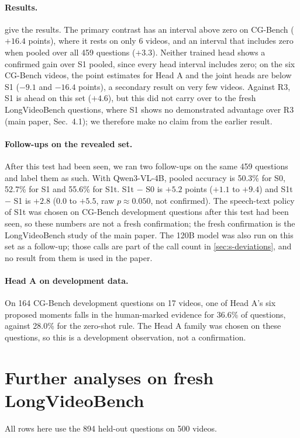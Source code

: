 \paragraph{Results.}
 give the results.
The primary contrast has an interval above zero on CG-Bench ($+16.4$ points), where it rests on only 6 videos, and an interval that includes zero when pooled over all 459 questions ($+3.3$).
Neither trained head shows a confirmed gain over S1 pooled, since every head interval includes zero; on the six CG-Bench videos, the point estimates for Head A and the joint heads are below S1 ($-9.1$ and $-16.4$ points), a secondary result on very few videos.
Against R3, S1 is ahead on this set ($+4.6$), but this did not carry over to the fresh LongVideoBench questions, where S1 shows no demonstrated advantage over R3 (main paper, Sec.~4.1); we therefore make no claim from the earlier result.

\paragraph{Follow-ups on the revealed set.}
After this test had been seen, we ran two follow-ups on the same 459 questions and label them as such.
With Qwen3-VL-4B, pooled accuracy is 50.3\% for S0, 52.7\% for S1 and 55.6\% for S1t.
S1t $-$ S0 is $+5.2$ points ($+1.1$ to $+9.4$) and S1t $-$ S1 is $+2.8$ ($0.0$ to $+5.5$, raw $p \approx 0.050$, not confirmed).
The speech-text policy of S1t was chosen on CG-Bench development questions after this test had been seen, so these numbers are not a fresh confirmation; the fresh confirmation is the LongVideoBench study of the main paper.
The 120B model was also run on this set as a follow-up; those calls are part of the call count in \cref{sec:s-deviations}, and no result from them is used in the paper.

\paragraph{Head A on development data.}
On 164 CG-Bench development questions on 17 videos, one of Head A's six proposed moments falls in the human-marked evidence for 36.6\% of questions, against 28.0\% for the zero-shot rule.
The Head A family was chosen on these questions, so this is a development observation, not a confirmation.

\section{Further analyses on fresh LongVideoBench}
\label{sec:s-lvb}
All rows here use the 894 held-out questions on 500 videos.


